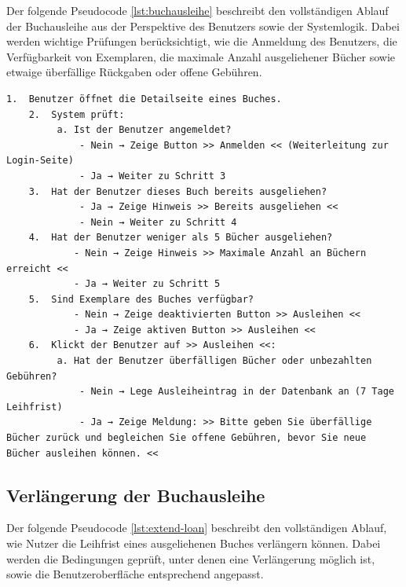 Der folgende Pseudocode \ref{lst:buchausleihe} beschreibt den vollständigen Ablauf der Buchausleihe aus der Perspektive des Benutzers sowie der Systemlogik. Dabei werden wichtige Prüfungen berücksichtigt, wie die Anmeldung des Benutzers, die Verfügbarkeit von Exemplaren, die maximale Anzahl ausgeliehener Bücher sowie etwaige überfällige Rückgaben oder offene Gebühren.

\begin{lstlisting}[style=pseudocode, caption={Pseudocode für den Ausleihvorgang eines Buches}, label={lst:buchausleihe}]
	1.  Benutzer öffnet die Detailseite eines Buches.
	2.  System prüft:
	     a. Ist der Benutzer angemeldet?
	         - Nein → Zeige Button >> Anmelden << (Weiterleitung zur Login-Seite)
	         - Ja → Weiter zu Schritt 3
	3.  Hat der Benutzer dieses Buch bereits ausgeliehen?
	         - Ja → Zeige Hinweis >> Bereits ausgeliehen <<
	         - Nein → Weiter zu Schritt 4
	4.  Hat der Benutzer weniger als 5 Bücher ausgeliehen?
	        - Nein → Zeige Hinweis >> Maximale Anzahl an Büchern erreicht <<
	        - Ja → Weiter zu Schritt 5
	5.  Sind Exemplare des Buches verfügbar?
         	- Nein → Zeige deaktivierten Button >> Ausleihen <<
	        - Ja → Zeige aktiven Button >> Ausleihen <<
	6.  Klickt der Benutzer auf >> Ausleihen <<:
	     a. Hat der Benutzer überfälligen Bücher oder unbezahlten Gebühren?
	         - Nein → Lege Ausleiheintrag in der Datenbank an (7 Tage Leihfrist) 
	         - Ja → Zeige Meldung: >> Bitte geben Sie überfällige Bücher zurück und begleichen Sie offene Gebühren, bevor Sie neue Bücher ausleihen können. <<
\end{lstlisting}


\subsection{Verlängerung der Buchausleihe}

Der folgende Pseudocode \ref{lst:extend-loan} beschreibt den vollständigen Ablauf, wie Nutzer die Leihfrist eines ausgeliehenen Buches verlängern können. Dabei werden die Bedingungen geprüft, unter denen eine Verlängerung möglich ist, sowie die Benutzeroberfläche entsprechend angepasst.

